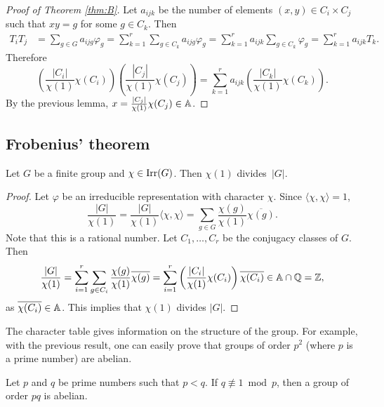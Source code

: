 \begin{proof}[Proof of Theorem \ref{thm:B}]
    Let $a_{ijk}$ be the number of elements 
    $(x,y)\in C_i\times C_j$ such that $xy=g$ for some $g\in C_k$. 
    Then 
    \begin{align*}
        T_iT_j & 
        =\sum_{g\in G}a_{ijg}\varphi_g
        =\sum_{k=1}^r\sum_{g\in C_k}a_{ijg}\varphi_g
        =\sum_{k=1}^ra_{ijk}\sum_{g\in C_k}\varphi_g
        =\sum_{k=1}^ra_{ijk}T_k.
    \end{align*}
    Therefore 
    \begin{equation}
        \label{eq:omega}
    \left(\frac{|C_i|}{\chi(1)}\chi(C_i)\right)
    \left(\frac{|C_j|}{\chi(1)}\chi(C_j)\right)
    =\sum_{k=1}^r a_{ijk}\left(\frac{|C_k|}{\chi(1)}\chi(C_k)\right).
    \end{equation}
    By the previous lemma, $x=\frac{|C_j|}{\chi(1)}\chi(C_j)\in\mathbb{A}$.
\end{proof}

\subsection{Frobenius' theorem}
\label{degree}

\begin{theorem}[Frobenius]
\label{thm:Frobenius_chi(1)}
    Let $G$ be a finite group and $\chi\in\operatorname{Irr}(G)$. 
    Then $\chi(1)$ divides~$|G|$. 
\end{theorem}

\begin{proof}
    Let $\varphi$ be an irreducible representation with character $\chi$. 
    Since $\langle\chi,\chi\rangle=1$, 
    \[
    \frac{|G|}{\chi(1)}=\frac{|G|}{\chi(1)}\langle\chi,\chi\rangle
    =\sum_{g\in G}\frac{\chi(g)}{\chi(1)}\overline{\chi(g)}.
    \]
    Note that this is a rational number. 
    Let $C_1,\dots,C_r$ be the conjugacy classes of $G$. 
    Then 
    \[
        \frac{|G|}{\chi(1)}
        =\sum_{i=1}^r\sum_{g\in C_i}\frac{\chi(g)}{\chi(1)}\overline{\chi(g)}
        =\sum_{i=1}^r\left(\frac{|C_i|}{\chi(1)}\chi(C_i)\right)\overline{\chi(C_i)}\in\mathbb{A}\cap\mathbb{Q}=\mathbb{Z},
    \]
    as $\overline{\chi(C_i)}\in\mathbb{A}$. This implies that $\chi(1)$ divides $|G|$. 
\end{proof}

The character table gives information on the structure of the group. For example,
with the previous result, one can easily prove that
groups of order $p^2$ (where $p$ is a prime number) are abelian. 

\begin{exercise}
    Let $p$ and $q$ be prime numbers such that $p<q$.
    If $q\not\equiv1\bmod p$, then a group of order $pq$ is abelian. 
\end{exercise}

